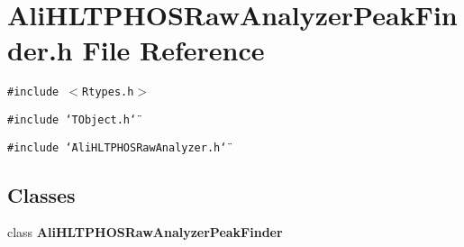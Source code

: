 \section{Ali\-HLTPHOSRaw\-Analyzer\-Peak\-Finder.h File Reference}
\label{AliHLTPHOSRawAnalyzerPeakFinder_8h}


{\tt \#include $<$Rtypes.h$>$}\par
{\tt \#include \char`\"{}TObject.h\char`\"{}}\par
{\tt \#include \char`\"{}Ali\-HLTPHOSRaw\-Analyzer.h\char`\"{}}\par
\subsection*{Classes}
\begin{CompactItemize}
\item 
class {\bf Ali\-HLTPHOSRaw\-Analyzer\-Peak\-Finder}
\end{CompactItemize}
